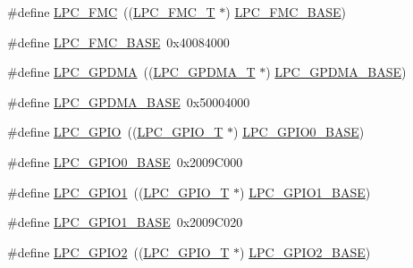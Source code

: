 \begin{DoxyCompactItemize}
\item 
\#define \hyperlink{group__PERIPH__175X__6X__BASE_ga406fa416fe50b196b86146ba0b20ba3c}{L\+P\+C\+\_\+\+F\+MC}~((\hyperlink{structLPC__FMC__T}{L\+P\+C\+\_\+\+F\+M\+C\+\_\+T}              $\ast$) \hyperlink{group__PERIPH__407X__8X__BASE_gaad6b7f57ab13bf5886da624bbb4bcc61}{L\+P\+C\+\_\+\+F\+M\+C\+\_\+\+B\+A\+SE})
\item 
\#define \hyperlink{group__PERIPH__175X__6X__BASE_gaad6b7f57ab13bf5886da624bbb4bcc61}{L\+P\+C\+\_\+\+F\+M\+C\+\_\+\+B\+A\+SE}~0x40084000
\item 
\#define \hyperlink{group__PERIPH__175X__6X__BASE_gaf9d4b843ddff8d08a27880f90e2dbf18}{L\+P\+C\+\_\+\+G\+P\+D\+MA}~((\hyperlink{structLPC__GPDMA__T}{L\+P\+C\+\_\+\+G\+P\+D\+M\+A\+\_\+T}            $\ast$) \hyperlink{group__PERIPH__407X__8X__BASE_ga51ba8e3f33730fa2b78be3f892d8c278}{L\+P\+C\+\_\+\+G\+P\+D\+M\+A\+\_\+\+B\+A\+SE})
\item 
\#define \hyperlink{group__PERIPH__175X__6X__BASE_ga51ba8e3f33730fa2b78be3f892d8c278}{L\+P\+C\+\_\+\+G\+P\+D\+M\+A\+\_\+\+B\+A\+SE}~0x50004000
\item 
\#define \hyperlink{group__PERIPH__175X__6X__BASE_ga8fce6a072685922bf3ebc1aa9070f408}{L\+P\+C\+\_\+\+G\+P\+IO}~((\hyperlink{structLPC__GPIO__T}{L\+P\+C\+\_\+\+G\+P\+I\+O\+\_\+T}             $\ast$) \hyperlink{group__PERIPH__407X__8X__BASE_ga09e0e964ea1abf3b991772df2aa52405}{L\+P\+C\+\_\+\+G\+P\+I\+O0\+\_\+\+B\+A\+SE})
\item 
\#define \hyperlink{group__PERIPH__175X__6X__BASE_ga09e0e964ea1abf3b991772df2aa52405}{L\+P\+C\+\_\+\+G\+P\+I\+O0\+\_\+\+B\+A\+SE}~0x2009\+C000
\item 
\#define \hyperlink{group__PERIPH__175X__6X__BASE_ga335587dad4e6d0da56c1f3ad1c087d10}{L\+P\+C\+\_\+\+G\+P\+I\+O1}~((\hyperlink{structLPC__GPIO__T}{L\+P\+C\+\_\+\+G\+P\+I\+O\+\_\+T}             $\ast$) \hyperlink{group__PERIPH__407X__8X__BASE_ga9fb0536853721a3073bd69d94d0b7ec2}{L\+P\+C\+\_\+\+G\+P\+I\+O1\+\_\+\+B\+A\+SE})
\item 
\#define \hyperlink{group__PERIPH__175X__6X__BASE_ga9fb0536853721a3073bd69d94d0b7ec2}{L\+P\+C\+\_\+\+G\+P\+I\+O1\+\_\+\+B\+A\+SE}~0x2009\+C020
\item 
\#define \hyperlink{group__PERIPH__175X__6X__BASE_ga27a09e8c08f9e209c6af70b0a3c56b39}{L\+P\+C\+\_\+\+G\+P\+I\+O2}~((\hyperlink{structLPC__GPIO__T}{L\+P\+C\+\_\+\+G\+P\+I\+O\+\_\+T}             $\ast$) \hyperlink{group__PERIPH__407X__8X__BASE_gae5524b2d728167194033ec7a1841a36b}{L\+P\+C\+\_\+\+G\+P\+I\+O2\+\_\+\+B\+A\+SE})
\item 

\end{DoxyCompactItemize}
